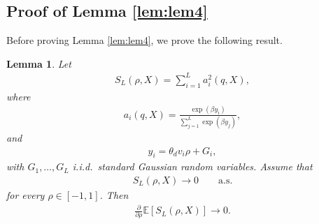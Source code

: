 \documentclass[11pt,a4paper]{article}
\newtheorem{lemma}{Lemma}
\theoremstyle{definition}
\begin{document}
\subsection{Proof of Lemma \ref{lem:lem4}}
Before proving Lemma \ref{lem:lem4}, we prove the following result. 
\begin{lemma} \label{lem:aux1} 
Let
\begin{align}
S_L(\rho,X)
=
\sum_{i=1}^{L} a_i^2(q,X),
\end{align}
where
\begin{align}
a_i(q,X)
=
\frac{\exp(\beta y_i)}
{\sum_{j=1}^{L}\exp(\beta y_j)},
\end{align}
and
\begin{align}
y_i
=
\theta_d v_i \rho + G_i,
\end{align}
with $G_1,\ldots,G_L$ i.i.d.\ standard Gaussian random variables.
Assume that
\begin{align}
S_L(\rho,X)\to 0
\qquad\text{a.s.}
\end{align}
for every $\rho\in[-1,1]$.
Then
\begin{align}
\frac{\partial}{\partial\rho}
\mathbb E[S_L(\rho,X)]
\longrightarrow 0.
\end{align}
\end{lemma}
\end{document}
